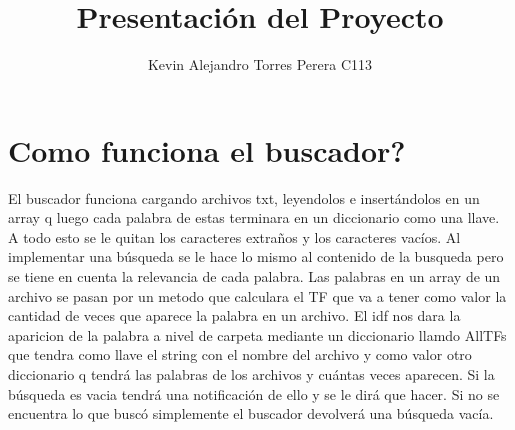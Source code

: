 \documentclass[a4paper,12pt]{article}
\begin{document}
\title{Presentación del Proyecto}
\author{Kevin Alejandro Torres Perera C113}

\maketitle

\section{Como funciona el buscador?}



\begin{flushleft}
El buscador funciona cargando archivos txt, leyendolos e insertándolos en un array q luego cada palabra de estas terminara en un diccionario como una llave. A todo esto se le quitan los caracteres extraños y los caracteres vacíos. Al implementar una búsqueda se le hace lo mismo al contenido de la busqueda pero se tiene en cuenta la relevancia de cada palabra. Las palabras en un array de un archivo se pasan por un metodo que calculara el TF que va a tener como valor la cantidad de veces que aparece la palabra en un archivo. El idf nos dara la aparicion de la palabra a nivel de carpeta mediante un diccionario llamdo AllTFs que tendra como llave el string con el nombre del archivo y como valor otro diccionario q tendrá las palabras de los archivos y cuántas veces aparecen. Si la búsqueda es vacia tendrá una notificación de ello y se le dirá que hacer. Si no se encuentra lo que buscó simplemente el buscador devolverá una búsqueda vacía.


\end{flushleft}
\end{document}
